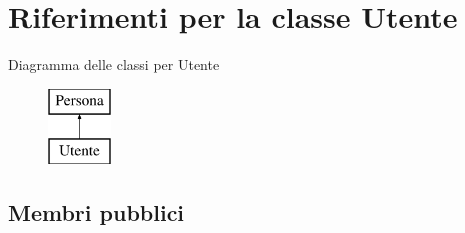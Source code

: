 \hypertarget{class_utente}{}\section{Riferimenti per la classe Utente}
\label{class_utente}
Diagramma delle classi per Utente\begin{figure}[H]
\begin{center}
\leavevmode
\includegraphics[height=2.000000cm]{class_utente}
\end{center}
\end{figure}
\subsection*{Membri pubblici}
